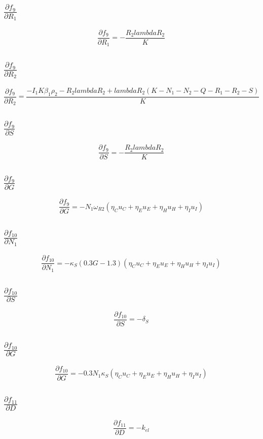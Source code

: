 \documentclass{article}
\begin{document}
\subsection{$\frac{\partial f_{9}}{\partial R_1}$}
\[
\frac{\partial f_{9}}{\partial R_1} = - \frac{R_{2} lambdaR_{2}}{K}
\]

\subsection{$\frac{\partial f_{9}}{\partial R_2}$}
\[
\frac{\partial f_{9}}{\partial R_2} = \frac{- I_{1} K \beta_{1} \rho_{2} - R_{2} lambdaR_{2} + lambdaR_{2} \left(K - N_{1} - N_{2} - Q - R_{1} - R_{2} - S\right)}{K}
\]

\subsection{$\frac{\partial f_{9}}{\partial S}$}
\[
\frac{\partial f_{9}}{\partial S} = - \frac{R_{2} lambdaR_{2}}{K}
\]

\subsection{$\frac{\partial f_{9}}{\partial G}$}
\[
\frac{\partial f_{9}}{\partial G} = - N_{1} \omega_{R2} \left(\eta_{C} u_{C} + \eta_{E} u_{E} + \eta_{H} u_{H} + \eta_{I} u_{I}\right)
\]

\subsection{$\frac{\partial f_{10}}{\partial N_1}$}
\[
\frac{\partial f_{10}}{\partial N_1} = - \kappa_{S} \left(0.3 G - 1.3\right) \left(\eta_{C} u_{C} + \eta_{E} u_{E} + \eta_{H} u_{H} + \eta_{I} u_{I}\right)
\]

\subsection{$\frac{\partial f_{10}}{\partial S}$}
\[
\frac{\partial f_{10}}{\partial S} = - \delta_{S}
\]

\subsection{$\frac{\partial f_{10}}{\partial G}$}
\[
\frac{\partial f_{10}}{\partial G} = - 0.3 N_{1} \kappa_{S} \left(\eta_{C} u_{C} + \eta_{E} u_{E} + \eta_{H} u_{H} + \eta_{I} u_{I}\right)
\]

\subsection{$\frac{\partial f_{11}}{\partial D}$}
\[
\frac{\partial f_{11}}{\partial D} = - k_{el}
\]
\end{document}
